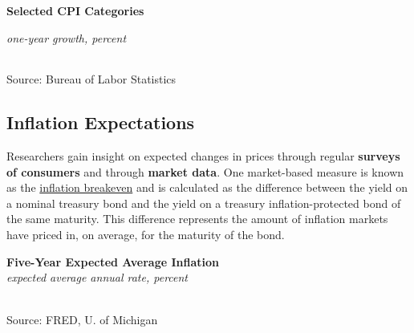 \documentclass{report}
\makeatletter
\newcommand{\tbllink}[1]{\href{https://raw.githubusercontent.com/bdecon/US-chartbook/master/chartbook/data/#1}{\faTable}}
\newcommand*\short[1]{\expandafter\@gobbletwo\number\numexpr#1\relax}
\newcommand{\absnode}[3]{\node[below right, align=left] at (axis cs: #1,#2) {#3};}
\newcommand{\ltdateaxisticks}{
		date coordinates in=x, axis line style={draw=none},
		xmax={2022-10-31},
		max space between ticks=40,	    
		xtick={{2013-01-01}, {2014-01-01}, {2015-01-01}, {2016-01-01}, {2017-01-01}, {2018-01-01}, 
		    {2019-01-01}, {2020-01-01}, {2021-01-01}, {2022-01-01}},
		enlarge y limits={0.06}, enlarge x limits={0.01},
		}
\newcommand{\bbar}[2]{extra #1 ticks = {{#2}}, extra #1 tick labels = ,
		extra #1 tick style = {grid=major, grid style={thick, black!25}},}
\newcommand{\stdline}[4]{\addplot[very thick, no markers, color=#1] 
		table [x=#2, y=#3, col sep=comma] {#4};	}
\newcommand{\thinline}[4]{\addplot[no markers, color=#1] 
		table [x=#2, y=#3, col sep=comma] {#4};	}
\newcommand{\rbar}{
		\fill[color=black!10] (axis cs:{2020-02-01},\pgfkeysvalueof{/pgfplots/ymin}) rectangle 
			(axis cs:{2020-05-01}, \pgfkeysvalueof{/pgfplots/ymax});}
\makeatother
\begin{document}
{\begin{minipage}{0.76\textwidth}
\normalsize \textbf{Selected CPI Categories}\\
\footnotesize{\textit{one-year growth, percent}\\
\hspace*{-3mm}  \setlength{\tabcolsep}{2.6pt} \color{black!90}
		{\renewcommand{\arraystretch}{1.5}
\begin{tabular}{p{42mm} R{8.0mm} R{8.0mm} R{8.0mm} R{8.0mm}
		 		 R{8.0mm} R{10.0mm} R{12.0mm}} %
			  \hline
		\end{tabular}}}
\vspace{-2mm}		
		
\footnotesize{Source: Bureau of Labor Statistics}
\end{minipage}
\newpage
\hypertarget{prie}{}
\begin{minipage}{0.76\textwidth}
\subsection*{Inflation Expectations}
\vspace{-1mm}

\small Researchers gain insight on expected changes in prices through regular \textbf{surveys of consumers} and through \textbf{market data}. One market-based measure is known as the \href{https://fred.stlouisfed.org/series/T5YIE}{inflation breakeven} and is calculated as the difference between the yield on a nominal treasury bond and the yield on a treasury inflation-protected bond of the same maturity. This difference represents the amount of inflation markets have priced in, on average, for the maturity of the bond.
\end{minipage}

\begin{minipage}{0.38\textwidth}
\normalsize \textbf{Five-Year Expected Average Inflation}\\
\footnotesize{\textit{expected average annual rate, percent}}\\
\hspace*{-3mm} \\
\footnotesize{Source: FRED, U. of Michigan} \hfill \tbllink{infbreak.csv}
\end{minipage} \hspace{6mm} 
\begin{minipage}{0.33\textwidth}
\small 


\end{minipage}}
\end{document}
